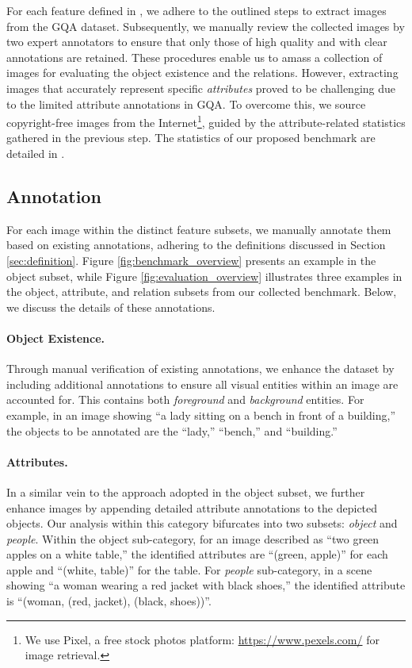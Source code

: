 For each feature defined in , we adhere to the outlined steps to extract images from the GQA dataset. Subsequently, we manually review the collected images by two expert annotators to ensure that only those of high quality and with clear annotations are retained. These procedures enable us to amass a collection of images for evaluating the object existence and the relations. However, extracting images that accurately represent specific \textit{attributes} proved to be challenging due to the limited attribute annotations in GQA. To overcome this, we source copyright-free images from the Internet\footnote{We use Pixel, a free stock photos platform: \url{https://www.pexels.com/} for image retrieval.}, guided by the attribute-related statistics gathered in the previous step. The statistics of our proposed benchmark are detailed in .

\vspace{-1mm}
\subsection{Annotation}
\label{sec:annotation}

For each image within the distinct feature subsets, we manually annotate them based on existing annotations, adhering to the definitions discussed in Section \ref{sec:definition}. Figure \ref{fig:benchmark_overview} presents an example in the object subset, while Figure \ref{fig:evaluation_overview} illustrates three examples in the object, attribute, and relation subsets from our collected benchmark. Below, we discuss the details of these annotations.

\paragraph{Object Existence.} Through manual verification of existing annotations, we enhance the dataset by including additional annotations to ensure all visual entities within an image are accounted for. This contains both \textit{foreground} and \textit{background} entities. For example, in an image showing ``a lady sitting on a bench in front of a building,'' the objects to be annotated are the ``lady,'' ``bench,'' and ``building.''

\paragraph{Attributes.} In a similar vein to the approach adopted in the object subset, we further enhance images by appending detailed attribute annotations to the depicted objects. Our analysis within this category bifurcates into two subsets: \textit{object} and \textit{people}. Within the object sub-category, for an image described as ``two green apples on a white table,'' the identified attributes are ``(green, apple)'' for each apple and ``(white, table)'' for the table. For \textit{people} sub-category, in a scene showing ``a woman wearing a red jacket with black shoes,'' the identified attribute is ``(woman, (red, jacket), (black, shoes))''.

